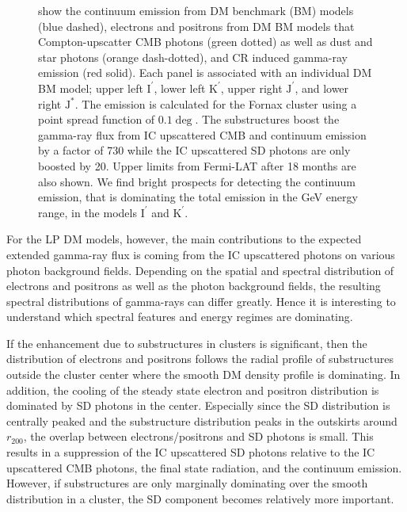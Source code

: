 \documentclass[10pt,aps,pra,reprint,amsmath,amsfonts,amssymb,showpacs,nofootinbib,floatfix]{revtex4-1}
\newcommand{\rmn}{\mathrm}
\newcommand{\Kp}{\rmn{K}^\prime}
\newcommand{\Ip}{\rmn{I}^\prime}
\newcommand{\Js}{\rmn{J}^*}
\newcommand{\Jp}{\rmn{J}^\prime}
\newcommand{\rvir}{r_{200}}
\begin{document}
\begin{figure}
\begin{minipage}{2.0\columnwidth}
{  show the continuum emission from DM benchmark (BM) models (blue
  dashed), electrons and positrons from DM BM models that
  Compton-upscatter CMB photons (green dotted) as well as dust and
  star photons (orange dash-dotted), and CR induced gamma-ray emission
  (red solid). Each panel is associated with an individual DM BM
  model; upper left $\Ip$, lower left $\Kp$, upper right $\Jp$, and
  lower right $\Js$. The emission is calculated for the Fornax cluster
  using a point spread function of $0.1\deg$. The substructures boost
  the gamma-ray flux from IC upscattered CMB and continuum emission by
  a factor of 730 while the IC upscattered SD photons are only boosted
  by 20. Upper limits from Fermi-LAT after 18 months \protect
  \cite{2010ApJ...717L..71A} are also shown. We find bright prospects
  for detecting the continuum emission, that is dominating the total
  emission in the GeV energy range, in the models $\Ip$ and $\Kp$.}
 \label{fig:diff_BM}
\end{minipage}
\end{figure}

For the LP DM models, however, the main contributions
to the expected extended gamma-ray flux is coming from the IC
upscattered photons on various photon background fields. Depending on
the spatial and spectral distribution of electrons and positrons as
well as the photon background fields, the resulting spectral
distributions of gamma-rays can differ greatly. Hence it is interesting
to understand which spectral features and energy regimes are
dominating.

If the enhancement due to substructures in clusters is significant,
then the distribution of electrons and positrons follows the radial
profile of substructures outside the cluster center where the smooth
DM density profile is dominating. In addition, the cooling of the
steady state electron and positron distribution is dominated by SD
photons in the center. Especially since the SD distribution is
centrally peaked and the substructure distribution peaks in the
outskirts around $\rvir$, the overlap between electrons/positrons and
SD photons is small. This results in a suppression of the IC
upscattered SD photons relative to the IC upscattered CMB photons, the
final state radiation, and the continuum emission. However, if
substructures are only marginally dominating over the smooth
distribution in a cluster, the SD component becomes relatively more
important.
\end{document}
